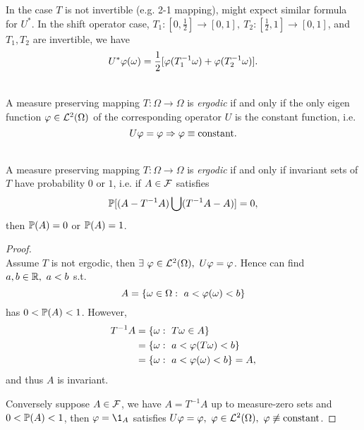 \np In the case $T$ is not invertible (e.g. 2-1 mapping), might expect similar formula for $U^*$. In the shift operator case, $T_1:[0,\frac{1}{2}] \to [0,1],\ T_2: [\frac{1}{2},1] \to [0,1]$, and $T_1, T_2$ are invertible, we have
\begin{equation*}
    U^* \vphi(\omega) = \frac{1}{2}[\vphi(T_1^{-1} \omega) + \vphi(T_2^{-1} \omega)].
\end{equation*}

\vspace{3pt}
\begin{definition}\ \\
A measure preserving mapping $T: \Omega \to \Omega$ is \textit{ergodic} if and only if the only eigen function $\vphi \in \Ls^2(\Omega)$ of the corresponding operator $U$ is the constant function, i.e.
\begin{equation*}
    U \vphi = \vphi \Rightarrow \vphi \equiv \text{constant}.
\end{equation*}
\end{definition}

\vspace{3pt}
\begin{lemma}\ \\
A measure preserving mapping $T: \Omega \to \Omega$ is \textit{ergodic} if and only if invariant sets of $T$ have probability $0$ or $1$, i.e. if $A \in \Fs$ satisfies 
\begin{equation*}
    \P[(A - T^{-1} A) \cup (T^{-1} A - A)] = 0, 
\end{equation*}
then $\P(A) = 0$ or $\P(A) = 1$.
\end{lemma}
\begin{proof}\ \\
Assume $T$ is not ergodic, then $\exists\ \vphi \in \Ls^2(\Omega),\ U \vphi = \vphi$. Hence can find $a,b \in \R,\ a < b$ s.t. 
\begin{equation*}
    A = \{\omega \in \Omega:\ a < \vphi(\omega) < b\}
\end{equation*}
has $0 < \P(A) < 1$. However,
\begin{align*}
    T^{-1}A &= \{\omega:\ T \omega \in A\}\\
    &= \{\omega:\ a < \vphi(T \omega) < b\}\\
    &= \{\omega:\ a < \vphi(\omega) < b\} = A,
\end{align*}
and thus $A$ is invariant.

\np Conversely suppose $A \in \Fs$, we have $A = T^{-1}A$ up to measure-zero sets and $0 < \P(A) < 1$, then $\vphi = \1_A$ satisfies $U \vphi = \vphi,\ \vphi \in \Ls^2(\Omega),\ \vphi \not\equiv \text{constant}$.
\end{proof}


